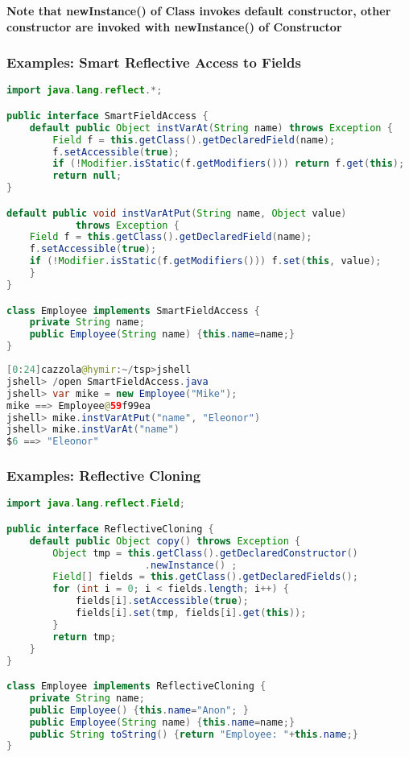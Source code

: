 \textbf{Note that newInstance() of Class invokes default constructor, other constructor are invoked with newInstance() of Constructor}

\subsubsection{Examples: Smart Reflective Access to Fields}

\begin{lstlisting}[language=Java]
import java.lang.reflect.*;

public interface SmartFieldAccess {
	default public Object instVarAt(String name) throws Exception {
		Field f = this.getClass().getDeclaredField(name);
		f.setAccessible(true);
		if (!Modifier.isStatic(f.getModifiers())) return f.get(this);
		return null;
}

default public void instVarAtPut(String name, Object value)
			throws Exception {
	Field f = this.getClass().getDeclaredField(name);
	f.setAccessible(true);
	if (!Modifier.isStatic(f.getModifiers())) f.set(this, value);
	}
}

class Employee implements SmartFieldAccess {
	private String name;
	public Employee(String name) {this.name=name;}
}
\end{lstlisting}

\begin{lstlisting}[language=Java]
[0:24]cazzola@hymir:~/tsp>jshell
jshell> /open SmartFieldAccess.java
jshell> var mike = new Employee("Mike");
mike ==> Employee@59f99ea
jshell> mike.instVarAtPut("name", "Eleonor")
jshell> mike.instVarAt("name")
$6 ==> "Eleonor"
\end{lstlisting}

\subsubsection{Examples: Reflective Cloning}

\begin{lstlisting}[language=Java]
import java.lang.reflect.Field;

public interface ReflectiveCloning {
	default public Object copy() throws Exception {
		Object tmp = this.getClass().getDeclaredConstructor()
						.newInstance() ;
		Field[] fields = this.getClass().getDeclaredFields();
		for (int i = 0; i < fields.length; i++) {
			fields[i].setAccessible(true);
			fields[i].set(tmp, fields[i].get(this));
		}
		return tmp;
	}
}

class Employee implements ReflectiveCloning {
	private String name;
	public Employee() {this.name="Anon"; }
	public Employee(String name) {this.name=name;}
	public String toString() {return "Employee: "+this.name;}
}
\end{lstlisting}

